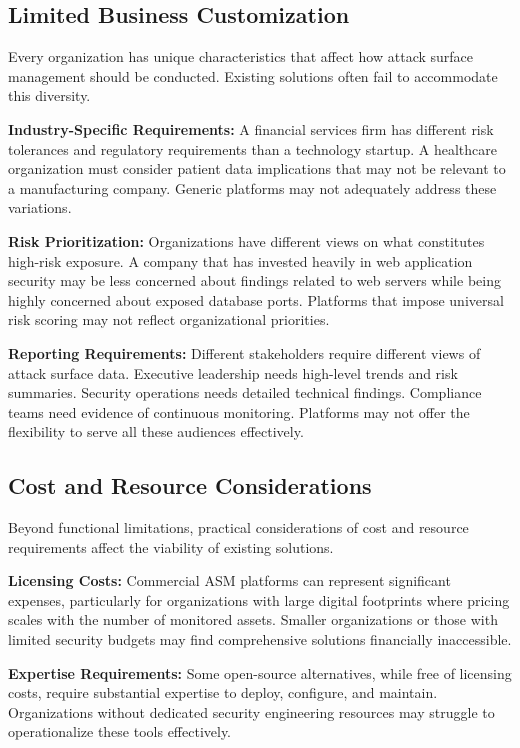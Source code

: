 \documentclass[a4paper,12pt]{report}
\begin{document}
\subsection{Limited Business Customization}

Every organization has unique characteristics that affect how attack surface management should be conducted. Existing solutions often fail to accommodate this diversity.\hfill \break

\textbf{Industry-Specific Requirements:} A financial services firm has different risk tolerances and regulatory requirements than a technology startup. A healthcare organization must consider patient data implications that may not be relevant to a manufacturing company. Generic platforms may not adequately address these variations.\hfill \break

\textbf{Risk Prioritization:} Organizations have different views on what constitutes high-risk exposure. A company that has invested heavily in web application security may be less concerned about findings related to web servers while being highly concerned about exposed database ports. Platforms that impose universal risk scoring may not reflect organizational priorities.\hfill \break

\textbf{Reporting Requirements:} Different stakeholders require different views of attack surface data. Executive leadership needs high-level trends and risk summaries. Security operations needs detailed technical findings. Compliance teams need evidence of continuous monitoring. Platforms may not offer the flexibility to serve all these audiences effectively.\hfill \break

\subsection{Cost and Resource Considerations}

Beyond functional limitations, practical considerations of cost and resource requirements affect the viability of existing solutions.\hfill \break

\textbf{Licensing Costs:} Commercial ASM platforms can represent significant expenses, particularly for organizations with large digital footprints where pricing scales with the number of monitored assets. Smaller organizations or those with limited security budgets may find comprehensive solutions financially inaccessible.\hfill \break

\textbf{Expertise Requirements:} Some open-source alternatives, while free of licensing costs, require substantial expertise to deploy, configure, and maintain. Organizations without dedicated security engineering resources may struggle to operationalize these tools effectively.\hfill \break
\end{document}
